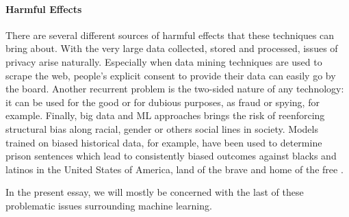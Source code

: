\documentclass{article}
\begin{document}
\paragraph{Harmful Effects}
There are several different sources of harmful effects that these techniques can bring about. With the very large data collected, stored and processed, issues of privacy arise naturally. Especially when data mining techniques are used to scrape the web, people's explicit consent to provide their data can easily go by the board. Another recurrent problem is the two-sided nature of any technology: it can be used for the good or for dubious purposes, as fraud or spying, for example. Finally, big data and ML approaches brings the risk of reenforcing structural bias along racial, gender or others social lines in society. Models trained on biased historical data, for example, have been used to determine prison sentences which lead to consistently biased outcomes against blacks and latinos in the United States of America, land of the brave and home of the free \cite{angwin2016machine}.



In the present essay, we will mostly be concerned with the last of these problematic issues surrounding machine learning.


\end{document}
